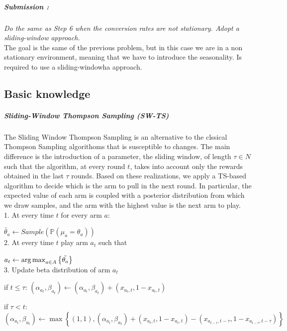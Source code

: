 \subparagraph*{Submission : }
\textit{Do the same as Step 6 when the conversion rates are not stationary. Adopt a sliding-window approach.}\\

The goal is the same of the previous problem, but in this case we are in a non stationary environment, meaning that we have to introduce the seasonality. Is required to use a sliding-windowha approach.

\subsection*{Basic knowledge}
\subparagraph*{Sliding-Window Thompson Sampling (SW-TS)} 
The Sliding Window Thompson Sampling is an alternative to the clssical Thompson Sampling algorithoms that is susceptible to changes. The main difference is the introduction of a parameter, the sliding window, of length $\tau\in N$ such that the algorithm, at every round $t$, takes into account only the rewards obtained in the last $\tau$ rounds. Based on these realizations, we apply a TS-based algorithm to decide which is the arm to pull in the next round. In particular, the expected value of each arm is coupled with a posterior distribution from which we draw samples, and the arm with the highest value is the next arm to play.\\

1. At every time $t$ for every arm $a$:

\hspace{2em}$\tilde{\theta_{a}} \leftarrow Sample(\mathbb P(\mu_{a}=\theta_{a}))$ \\

2. At every time $t$ play arm $a_{t}$ such that 

\hspace{2em}$a_{t} \leftarrow \operatorname{arg\,max}_{a \in A} \left\{ \tilde{\theta_{a}}  \right\} $ \\

3.  Update beta distribution of arm $a_{t}$

\hspace{2em}if $t\leq\tau$: $(\alpha_{a_{t}}, \beta_{a_{t}}) \leftarrow (\alpha_{a_{t}}, \beta_{a_{t}}) + (x_{a_{t},t}, 1 - x_{a_{t},t})$ 

\hspace{2em}if $\tau<t$:	$(\alpha_{a_{t}}, \beta_{a_{t}}) \leftarrow \max \left\{(1,1), (\alpha_{a_{t}}, \beta_{a_{t}}) + (x_{a_{t},t}, 1 - x_{a_{t},t}) - (x_{a_{t-\tau},t-\tau}, 1 - x_{a_{t-\tau},t-\tau})    \right\}$

